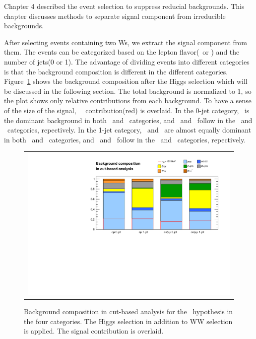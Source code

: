 Chapter 4 described the event selection to suppress reducial backgrounds. 
This chapter discusses methods to separate signal component from 
irreducible backgrounds. 

After selecting events containing two Ws, we extract the signal component 
from them. The events can be categorized based on the lepton flavor(\DF\ or \SF)
and the number of jets(0 or 1). The advantage of dividing events 
into different categories is that the background composition is different
in the different categories. 
Figure~\ref{fig:bkgcomposition} shows the background composition
after the Higgs selection which will be discussed in the following section.
The total background is normalized to 1, so the plot shows only relative 
contributions from each background. To have a sense of the size of the signal, 
~\GeV\ contribution(red) is overlaid. 
In the 0-jet category, \ww\ is the dominant background in both \DF\ and \SF\ 
categories, and \Wjets\ and \dyll\ follow in the \DF\ and \SF\ categories,
repectively. 
In the 1-jet category, \ww\ and \topbkg\ are almost equally dominant in both \DF\ and \SF\
categories, and \Wjets\ and \dyll\ follow in the \DF\ and \SF\ categories,
repectively.
%
\begin{figure}[htp] 
\centering 
\begin{tabular}{c} 
\includegraphics[width=0.99\textwidth]{figures/Bkgcomposition_cutbased.pdf} 
\end{tabular} 
\caption{Background composition in cut-based analysis for the  \GeV\ hypothesis
in the four categories. 
The Higgs selection in addition to WW selection is applied.  
The signal contribution is overlaid. 
} 
\label{fig:bkgcomposition} 
\end{figure} 

